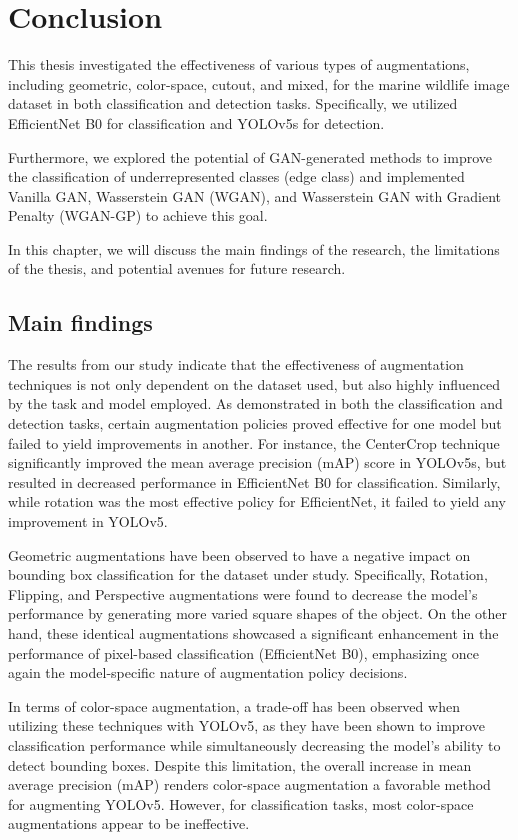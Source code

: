 \chapter{Conclusion} \label{discussion}
This thesis investigated the effectiveness of various types of augmentations, including geometric, color-space, cutout, and mixed, for the marine wildlife image dataset in both classification and detection tasks. Specifically, we utilized EfficientNet B0 for classification and YOLOv5s for detection. 

Furthermore, we explored the potential of GAN-generated methods to improve the classification of underrepresented classes (edge class) and implemented Vanilla GAN, Wasserstein GAN (WGAN), and Wasserstein GAN with Gradient Penalty (WGAN-GP) to achieve this goal.

In this chapter, we will discuss the main findings of the research, the limitations of the thesis, and potential avenues for future research.
\section{Main findings}
The results from our study indicate that the effectiveness of augmentation techniques is not only dependent on the dataset used, but also highly influenced by the task and model employed. As demonstrated in both the classification and detection tasks, certain augmentation policies proved effective for one model but failed to yield improvements in another. For instance, the CenterCrop technique significantly improved the mean average precision (mAP) score in YOLOv5s, but resulted in decreased performance in EfficientNet B0 for classification. Similarly, while rotation was the most effective policy for EfficientNet, it failed to yield any improvement in YOLOv5.

Geometric augmentations have been observed to have a negative impact on bounding box classification for the dataset under study. Specifically, Rotation, Flipping, and Perspective augmentations were found to decrease the model's performance by generating more varied square shapes of the object. On the other hand, these identical augmentations showcased a significant enhancement in the performance of pixel-based classification (EfficientNet B0), emphasizing once again the model-specific nature of augmentation policy decisions.

In terms of color-space augmentation, a trade-off has been observed when utilizing these techniques with YOLOv5, as they have been shown to improve classification performance while simultaneously decreasing the model's ability to detect bounding boxes. Despite this limitation, the overall increase in mean average precision (mAP) renders color-space augmentation a favorable method for augmenting YOLOv5. However, for classification tasks, most color-space augmentations appear to be ineffective.

